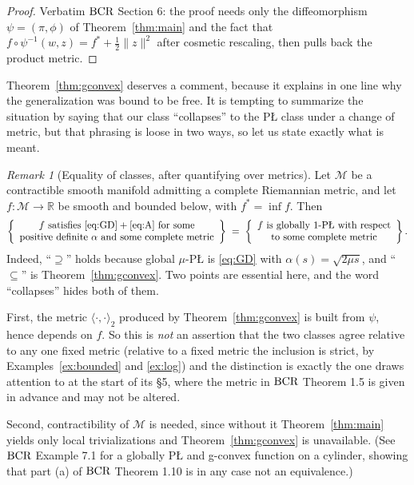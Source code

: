 \documentclass[11pt]{article}
\theoremstyle{plain}
\theoremstyle{definition}
\theoremstyle{remark}
\newtheorem{rem}[thm]{Remark}
\newcommand{\M}{\mathcal{M}}
\newcommand{\R}{\mathbb{R}}
\newcommand{\bcr}{\textup{BCR}}
\begin{document}
\begin{proof}
Verbatim $\bcr$ Section 6: the proof needs only the diffeomorphism
$\psi=(\pi,\phi)$ of Theorem~\ref{thm:main} and the fact that
$f\circ\psi^{-1}(w,z) = f^* + \tfrac12\|z\|^2$ after cosmetic rescaling, then
pulls back the product metric.
\end{proof}

Theorem~\ref{thm:gconvex} deserves a comment, because it explains in one line
why the generalization was bound to be free. It is tempting to summarize the
situation by saying that our class ``collapses'' to the P\L{} class under a
change of metric, but that phrasing is loose in two ways, so let us state
exactly what is meant.

\begin{rem}[Equality of classes, after quantifying over metrics]\label{rem:collapse}
Let $\M$ be a contractible smooth manifold admitting a complete Riemannian
metric, and let $f\colon\M\to\R$ be smooth and bounded below, with
$f^*=\inf f$. Then
\[
  \left\{\begin{array}{c}
    f \text{ satisfies } \eqref{eq:GD}+\eqref{eq:A} \text{ for some}\\
    \text{positive definite } \alpha \text{ and some complete metric}
  \end{array}\right\}
  \;=\;
  \left\{\begin{array}{c}
    f \text{ is globally } 1\text{-P\L{} with respect}\\
    \text{to some complete metric}
  \end{array}\right\} .
\]
Indeed, ``$\supseteq$'' holds because global $\mu$-P\L{} is \eqref{eq:GD} with
$\alpha(s)=\sqrt{2\mu s}$, and ``$\subseteq$'' is Theorem~\ref{thm:gconvex}.
Two points are essential here, and the word ``collapses'' hides both of them.

First, the metric $\langle\cdot,\cdot\rangle_2$ produced by
Theorem~\ref{thm:gconvex} is built from $\psi$, hence depends on $f$. So this is
\emph{not} an assertion that the two classes agree relative to any one fixed
metric (relative to a fixed metric the inclusion is strict, by
Examples~\ref{ex:bounded} and \ref{ex:log}) and the distinction is exactly the
one \cite{BCR2026} draws attention to at the start of its \S5, where the metric
in $\bcr$ Theorem 1.5 is given in advance and may not be altered.

Second, contractibility of $\M$ is needed, since without it
Theorem~\ref{thm:main} yields only local trivializations and
Theorem~\ref{thm:gconvex} is unavailable. (See $\bcr$ Example 7.1 for a
globally P\L{} and g-convex function on a cylinder, showing that part (a) of
$\bcr$ Theorem 1.10 is in any case not an equivalence.)
\end{rem}
\end{document}
